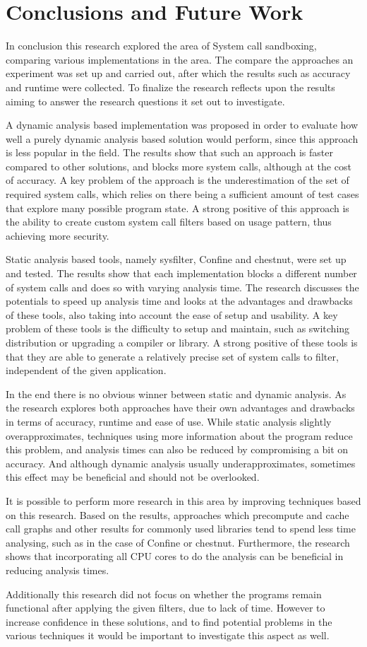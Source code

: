 \section{Conclusions and Future Work}
In conclusion this research explored the area of System call sandboxing, comparing various implementations in the area. The compare the approaches an experiment was set up and carried out, after which the results such as accuracy and runtime were collected. To finalize the research reflects upon the results aiming to answer the research questions it set out to investigate.

A dynamic analysis based implementation was proposed in order to evaluate how well a purely dynamic analysis based solution would perform, since this approach is less popular in the field.
The results show that such an approach is faster compared to other solutions, and blocks more system calls, although at the cost of accuracy.
A key problem of the approach is the underestimation of the set of required system calls, which relies on there being a sufficient amount of test cases that explore many possible program state.
A strong positive of this approach is the ability to create custom system call filters based on usage pattern, thus achieving more security.

Static analysis based tools, namely sysfilter, Confine and chestnut, were set up and tested.
The results show that each implementation blocks a different number of system calls and does so with varying analysis time.
The research discusses the potentials to speed up analysis time and looks at the advantages and drawbacks of these tools, also taking into account the ease of setup and usability.
A key problem of these tools is the difficulty to setup and maintain, such as switching distribution or upgrading a compiler or library.
A strong positive of these tools is that they are able to generate a relatively precise set of system calls to filter, independent of the given application.

In the end there is no obvious winner between static and dynamic analysis.
As the research explores both approaches have their own advantages and drawbacks in terms of accuracy, runtime and ease of use.
While static analysis slightly overapproximates, techniques using more information about the program reduce this problem, and analysis times can also be reduced by compromising a bit on accuracy.
And although dynamic analysis usually underapproximates, sometimes this effect may be beneficial and should not be overlooked.

It is possible to perform more research in this area by improving techniques based on this research.
Based on the results, approaches which precompute and cache call graphs and other results for commonly used libraries tend to spend less time analysing, such as in the case of Confine or chestnut.
Furthermore, the research shows that incorporating all CPU cores to do the analysis can be beneficial in reducing analysis times.

Additionally this research did not focus on whether the programs remain functional after applying the given filters, due to lack of time.
However to increase confidence in these solutions, and to find potential problems in the various techniques it would be important to investigate this aspect as well.
